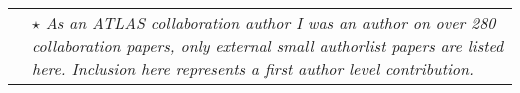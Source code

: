 \documentclass[10pt,a4paper,sans,dvipsnames,roman]{moderncv}        %
\makeatletter
\renewcommand*{\cvitem}[3][.25em]{%
  \begin{tabular}{@{}
    p{\hintscolumnwidth}@{\hspace{\separatorcolumnwidth}}p{\maincolumnwidth-\hintscolumnwidth-\separatorcolumnwidth}@{}}%
    \raggedleft\hintstyle{\raggedleft 
      \footnotesize\textcolor{gray}{#2}} &{ 
      #3}%
  \end{tabular}%
  \par\addvspace{#1}}
\makeatother
\begin{document}
\nocite{*}
%
%

 
\vspace{1cm}
\cvitem{}{\small{\emph{$\star$ As an ATLAS collaboration author I was an author on over 280 collaboration papers, only external small authorlist papers are listed here. Inclusion here represents a first author level contribution.}}}
\end{document}
